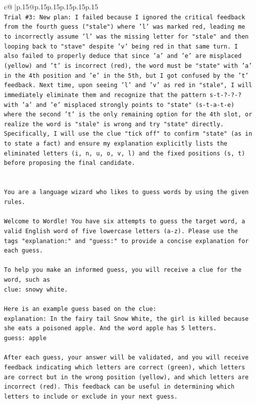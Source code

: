 \documentclass{article}
\begin{document}
{\begin{supertabular}{c@{$\;$}|p{.15\linewidth}@{}p{.15\linewidth}p{.15\linewidth}p{.15\linewidth}p{.15\linewidth}p{.15\linewidth}}
{{{\\ 
\texttt{Trial \#3: New plan: I failed because I ignored the critical feedback from the fourth guess ("stale") where 'l' was marked red, leading me to incorrectly assume 'l' was the missing letter for "stale" and then looping back to "stave" despite 'v' being red in that same turn. I also failed to properly deduce that since 'a' and 'e' are misplaced (yellow) and 't' is incorrect (red), the word must be "state" with 'a' in the 4th position and 'e' in the 5th, but I got confused by the 't' feedback. Next time, upon seeing 'l' and 'v' as red in "stale", I will immediately eliminate them and recognize that the pattern s{-}t{-}?{-}?{-}? with 'a' and 'e' misplaced strongly points to "state" (s{-}t{-}a{-}t{-}e) where the second 't' is the only remaining option for the 4th slot, or realize the word is "stale" is wrong and try "state" directly. Specifically, I will use the clue "tick off" to confirm "state" (as in to state a fact) and ensure my explanation explicitly lists the eliminated letters (i, n, u, o, v, l) and the fixed positions (s, t) before proposing the final candidate.} \\
\\ 
\\ 
\texttt{You are a language wizard who likes to guess words by using the given rules.} \\
\\ 
\texttt{Welcome to Wordle! You have six attempts to guess the target word, a valid English word of five lowercase letters (a{-}z). Please use the tags "explanation:" and "guess:" to provide a concise explanation for each guess.} \\
\\ 
\texttt{To help you make an informed guess, you will receive a clue for the word, such as} \\
\texttt{clue: snowy white.} \\
\\ 
\texttt{Here is an example guess based on the clue:} \\
\texttt{explanation: In the fairy tail Snow White, the girl is killed because she eats a poisoned apple. And the word apple has 5 letters.} \\
\texttt{guess: apple} \\
\\ 
\texttt{After each guess, your answer will be validated, and you will receive feedback indicating which letters are correct (green), which letters are correct but in the wrong position (yellow), and which letters are incorrect (red). This feedback can be useful in determining which letters to include or exclude in your next guess.} \\
}}}
\end{supertabular}}
\end{document}
